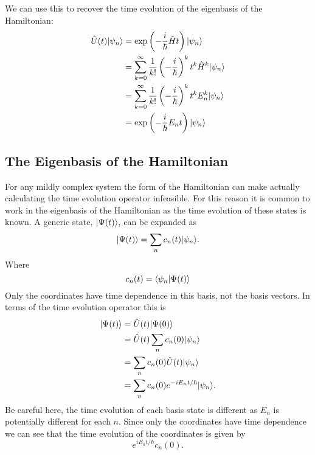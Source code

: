     We can use this to recover the time evolution of the eigenbasis of the Hamiltonian:
    \begin{align*}
        \hat{U}(t)\vert {\psi_n} \rangle &= \exp\left(-\frac{i}{\hbar}\hat{H}t\right) \vert {\psi_n} \rangle\\
        &= \sum_{k=0}^{\infty} \frac{1}{k!}\left(-\frac{i}{\hbar}\right)^k t^k\hat{H}^k \vert {\psi_n} \rangle\\
        &= \sum_{k=0}^{\infty} \frac{1}{k!}\left(-\frac{i}{\hbar}\right)^k t^kE_n^k \vert {\psi_n} \rangle\\
        &= \exp\left(-\frac{i}{\hbar}E_nt\right) \vert {\psi_n} \rangle\\
    \end{align*}
    
    \subsection{The Eigenbasis of the Hamiltonian}
    For any mildly complex system the form of the Hamiltonian can make actually calculating the time evolution operator infeasible.
    For this reason it is common to work in the eigenbasis of the Hamiltonian as the time evolution of these states is known.
    A generic state, \(\vert {\Psi(t)} \rangle\), can be expanded as
    \[\vert {\Psi(t)} \rangle = \sum_n c_n(t)\vert {\psi_n} \rangle.\]
    Where
    \[c_n(t) = \langle {\psi_n} \vert {\Psi(t)} \rangle\]
    Only the coordinates have time dependence in this basis, not the basis vectors.
    In terms of the time evolution operator this is
    \begin{align*}
        \vert {\Psi(t)} \rangle &= \hat{U}(t)\vert {\Psi(0)} \rangle\\
        &= \hat{U}(t)\sum_n c_n(0)\vert {\psi_n} \rangle\\
        &= \sum_n c_n(0) \hat{U}(t)\vert {\psi_n} \rangle\\
        &= \sum_n c_n(0) e^{-iE_nt/\hbar}\vert {\psi_n} \rangle.
    \end{align*}
    Be careful here, the time evolution of each basis state is different as \(E_n\) is potentially different for each \(n\).
    Since only the coordinates have time dependence we can see that the time evolution of the coordinates is given by
    \[e^{iE_nt/\hbar}c_n(0).\]
    
